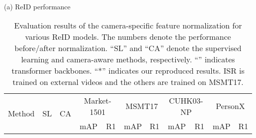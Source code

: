 \begin{table}[t]
    \tiny
    \caption{
        Evaluation results of the camera-specific feature normalization for various ReID models.
        The numbers denote the performance before/after normalization.
        ``SL'' and ``CA'' denote the supervised learning and camera-aware methods, respectively.
        ``\textdagger'' indicates transformer backbones.
        ``*'' indicates our reproduced results.
        ISR is trained on external videos and the others are trained on MSMT17.
    }
    \vspace{3pt}
    \label{tab:main_fd_real}
    \setlength{\tabcolsep}{0.61em}
    {\scriptsize (a) ReID performance }\\
    {
    \renewcommand{\arraystretch}{1.2}
    \begin{tabular}{lcc|cc|cc|cc|cc}
        \hline
        \multicolumn{1}{l}{\multirow{2}{*}{Method}} & 
        \multicolumn{1}{c}{\multirow{2}{*}{SL}} & 
        \multicolumn{1}{c|}{\multirow{2}{*}{CA}} & 
        \multicolumn{2}{c|}{Market-1501} & 
        \multicolumn{2}{c|}{MSMT17} & 
        \multicolumn{2}{c|}{CUHK03-NP} &
        \multicolumn{2}{c}{PersonX} \\
        
        \cline{4-11}
        \multicolumn{1}{c}{} &
        \multicolumn{1}{c}{} &  
        \multicolumn{1}{c|}{} & 
        mAP & R1 & mAP & R1 & mAP & R1 & mAP & R1 \\ 
        \hline \hline
        

\end{tabular}}
\end{table}

